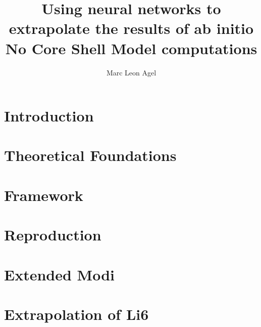 






\title{Using neural networks to extrapolate the results of
  ab initio No Core Shell Model computations}
\author{Marc Leon Agel}
\reviewer{ }


\submissiondate{\today}
\examdate{\today}

\maketitle

\affidavit

\tableofcontents

\chapter{Introduction}


\chapter{Theoretical Foundations}


\chapter{Framework}
\label{chap:framework}


\chapter{Reproduction}
\label{chap:reproduction}


\chapter{Extended Modi}


\chapter{Extrapolation of Li6}

